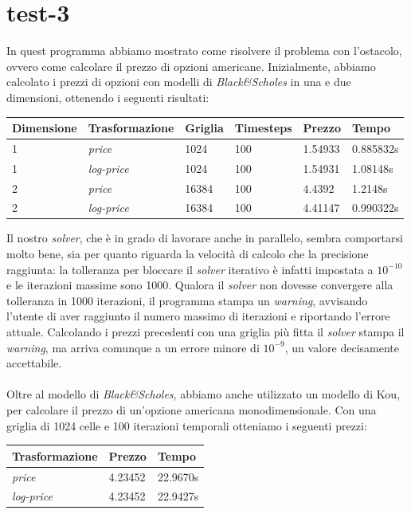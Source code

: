 \documentclass[a4paper,10pt]{report}
\theoremstyle{plain}
\theoremstyle{definition}
\theoremstyle{remark}
\begin{document}
\section{\textsf{test-3}}
In quest programma abbiamo mostrato come risolvere il problema con l'ostacolo, ovvero come calcolare il prezzo di opzioni americane. Inizialmente, abbiamo calcolato i prezzi di opzioni con modelli di \emph{Black\&Scholes} in una e due dimensioni, ottenendo i seguenti risultati:
\begin{center}
\begin{tabular}{| l | l | l | l | l | l |}
\hline
Dimensione & Trasformazione & Griglia & Timesteps & Prezzo & Tempo \\ \hline
1 & \emph{price} & 1024 & 100 & 1.54933 & 0.885832s \\ \hline
1 & \emph{log-price} & 1024 & 100 & 1.54931 & 1.08148s \\ \hline
2 & \emph{price} & 16384 & 100 & 4.4392 & 1.2148s \\ \hline
2 & \emph{log-price} & 16384 & 100 & 4.41147 & 0.990322s \\ \hline
\end{tabular}
\end{center}
Il nostro \emph{solver}, che \`e in grado di lavorare anche in parallelo, sembra comportarsi molto bene, sia per quanto riguarda la velocit\`a di calcolo che la precisione raggiunta: la tolleranza per bloccare il \emph{solver} iterativo \`e infatti impostata a $10^{-10}$ e le iterazioni massime sono 1000. Qualora il \emph{solver} non dovesse convergere alla tolleranza in 1000 iterazioni, il programma stampa un \emph{warning}, avvisando l'utente di aver raggiunto il numero massimo di iterazioni e riportando l'errore attuale. Calcolando i prezzi precedenti con una griglia pi\`u fitta il \emph{solver} stampa il \emph{warning}, ma arriva comunque a un errore minore di $10^{-9}$, un valore decisamente accettabile.\\\\Oltre al modello di \emph{Black\&Scholes}, abbiamo anche utilizzato un modello di Kou, per calcolare il prezzo di un'opzione americana monodimensionale. Con una griglia di 1024 celle e 100 iterazioni temporali otteniamo i seguenti prezzi:
\begin{center}
\begin{tabular}{| l | l | l |}
\hline
Trasformazione & Prezzo & Tempo \\ \hline
\emph{price} & 4.23452 & 22.9670s \\ \hline
\emph{log-price} & 4.23452 & 22.9427s \\ \hline
\end{tabular}
\end{center}
\end{document}

